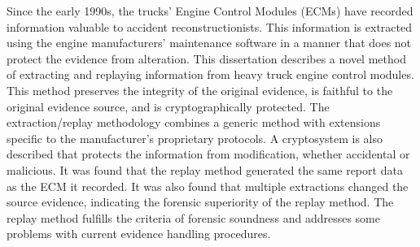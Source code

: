 Since the early 1990s, the trucks' Engine Control Modules (ECMs) have recorded information valuable to accident
reconstructionists. This information is extracted using the engine manufacturers' maintenance software in
a manner that does not protect the evidence from alteration. This dissertation describes a novel method
of extracting and replaying information from heavy truck engine control modules. This method preserves
the integrity of the original evidence, is faithful to the original evidence source, and is cryptographically
protected. The extraction/replay methodology combines a generic method with extensions specific to
the manufacturer's proprietary protocols.
A cryptosystem is also described that protects the information from modification, whether accidental or malicious.
It was found that the replay method generated the same report data as the ECM it recorded. It was also found that
multiple extractions changed the source evidence, indicating the forensic superiority of the replay method.
The replay method fulfills the criteria of forensic soundness and addresses some problems with current
evidence handling procedures.
